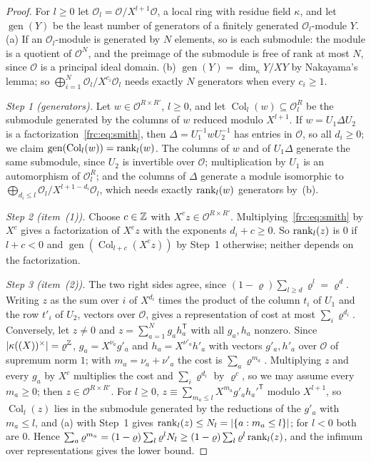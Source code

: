\begin{proof}
For $l\ge0$ let $\mathcal O_l=\mathcal O/X^{l+1}\mathcal O$, a local ring with residue field $\kappa$, and let
$\operatorname{gen}(Y)$ be the least number of generators of a finitely generated $\mathcal O_l$\nobreakdash-module $Y$.
(a) If an $\mathcal O_l$\nobreakdash-module is generated by $N$ elements, so is each submodule: the module is a quotient of
$\mathcal O^N$, and the preimage of the submodule is free of rank at most $N$, since $\mathcal O$ is a principal ideal
domain. (b) $\operatorname{gen}(Y)=\dim_\kappa Y/XY$ by Nakayama's lemma; so
$\bigoplus_{i=1}^N\mathcal O_l/X^{c_i}\mathcal O_l$ needs exactly $N$ generators when every $c_i\ge1$.

\emph{Step 1 (generators).} Let $w\in\mathcal O^{R\times R'}$, $l\ge0$, and let $\operatorname{Col}_l(w)\subseteq
\mathcal O_l^R$ be the submodule generated by the columns of $w$ reduced modulo $X^{l+1}$. If $w=U_1\Delta U_2$ is a
factorization~\eqref{frc:eq:smith}, then $\Delta=U_1^{-1}wU_2^{-1}$ has entries in $\mathcal O$, so all $d_i\ge0$; we
claim $\operatorname{gen}(\operatorname{Col}_l(w))=\operatorname{rank}_l(w)$. The columns of $w$ and of $U_1\Delta$ generate the same
submodule, since $U_2$ is invertible over $\mathcal O$; multiplication by $U_1$ is an automorphism of $\mathcal O_l^R$; and
the columns of $\Delta$ generate a module isomorphic to $\bigoplus_{d_i\le l}\mathcal O_l/X^{l+1-d_i}\mathcal O_l$, which
needs exactly $\operatorname{rank}_l(w)$ generators by~(b).

\emph{Step 2 (item~(1)).} Choose $c\in\mathbb Z$ with $X^cz\in\mathcal O^{R\times R'}$. Multiplying~\eqref{frc:eq:smith} by $X^c$
gives a factorization of $X^cz$ with the exponents $d_i+c\ge0$. So $\operatorname{rank}_l(z)$ is $0$ if $l+c<0$ and
$\operatorname{gen}(\operatorname{Col}_{l+c}(X^cz))$ by Step~1 otherwise; neither depends on the factorization.

\emph{Step 3 (item~(2)).} The two right sides agree, since $(1-\varrho)\sum_{l\ge d}\varrho^l=\varrho^d$. Writing $z$ as
the sum over $i$ of $X^{d_i}$ times the product of the column $t_i$ of $U_1$ and the row $t'_i$ of $U_2$, vectors over
$\mathcal O$, gives a representation of cost at most $\sum_i\varrho^{d_i}$. Conversely, let $z\ne0$ and
$z=\sum_{a=1}^Ng_ah_a^{\mathsf T}$ with all $g_a,h_a$ nonzero. Since $\lvert \kappa((X))^\times\rvert=\varrho^\mathbb Z$,
$g_a=X^{\nu_a}g'_a$ and $h_a=X^{\nu'_a}h'_a$ with vectors $g'_a,h'_a$ over $\mathcal O$ of supremum norm $1$; with
$m_a=\nu_a+\nu'_a$ the cost is $\sum_a\varrho^{m_a}$. Multiplying $z$ and every $g_a$ by $X^c$ multiplies the cost and
$\sum_i\varrho^{d_i}$ by $\varrho^c$, so we may assume every $m_a\ge0$; then $z\in\mathcal O^{R\times R'}$. For $l\ge0$,
$z\equiv\sum_{m_a\le l}X^{m_a}g'_ah_a'^{\mathsf T}$ modulo $X^{l+1}$, so $\operatorname{Col}_l(z)$ lies in the submodule
generated by the reductions of the $g'_a$ with $m_a\le l$, and (a) with Step~1 gives
$\operatorname{rank}_l(z)\le N_l=\lvert \{a:m_a\le l\}\rvert$; for $l<0$ both are $0$. Hence
$\sum_a\varrho^{m_a}=(1-\varrho)\sum_l\varrho^lN_l\ge(1-\varrho)\sum_l\varrho^l\operatorname{rank}_l(z)$, and the infimum over
representations gives the lower bound.


\end{proof}

